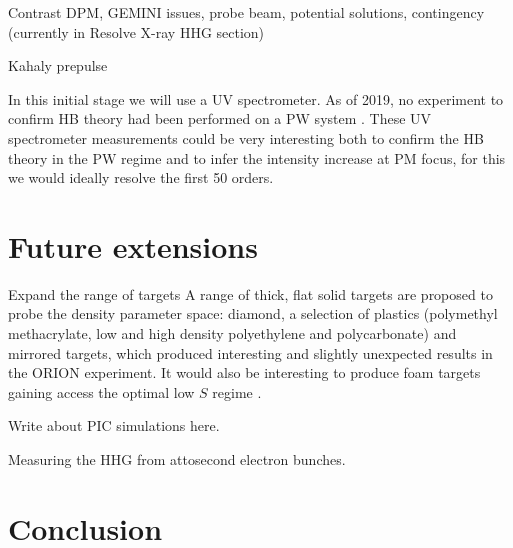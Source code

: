 Contrast DPM, GEMINI issues, probe beam, potential solutions, contingency (currently in Resolve X-ray HHG section)

Kahaly prepulse


In this initial stage we will use a UV spectrometer. As of 2019, no experiment to confirm HB theory had been performed on a PW system \cite{vincentiAchievingExtremeLight2019}. These UV spectrometer measurements could be very interesting both to confirm the HB theory in the PW regime and to infer the intensity increase at PM focus, for this we would ideally resolve the first 50 orders.


\section{Future extensions}

Expand the range of targets A range of thick, flat solid targets are proposed to probe the density parameter space: diamond, a selection of plastics (polymethyl methacrylate, low and high density polyethylene and polycarbonate) and mirrored targets, which produced interesting and slightly unexpected results in the ORION experiment. It would also be interesting to produce foam targets gaining access the optimal low $S$ regime \cite{bataniPhysicsIssuesShock2014}.

Write about PIC simulations here.

Measuring the HHG from attosecond electron bunches.


\section{Conclusion}







